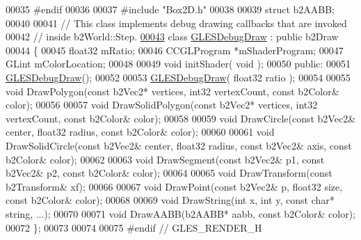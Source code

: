 \begin{DoxyCode}
00035 \textcolor{preprocessor}{#endif}
00036 \textcolor{preprocessor}{}
00037 \textcolor{preprocessor}{#include "Box2D.h"}
00038 
00039 \textcolor{keyword}{struct }b2AABB;
00040 
00041 \textcolor{comment}{// This class implements debug drawing callbacks that are invoked}
00042 \textcolor{comment}{// inside b2World::Step.}
\hypertarget{_g_l_e_s-_render_8h_source_l00043}{}\hyperlink{class_g_l_e_s_debug_draw}{00043} \textcolor{keyword}{class }\hyperlink{class_g_l_e_s_debug_draw}{GLESDebugDraw} : \textcolor{keyword}{public} b2Draw
00044 \{
00045     float32 mRatio;
00046     CCGLProgram *mShaderProgram;
00047     GLint       mColorLocation;
00048 
00049     \textcolor{keywordtype}{void} initShader( \textcolor{keywordtype}{void} );
00050 \textcolor{keyword}{public}:
00051     \hyperlink{class_g_l_e_s_debug_draw}{GLESDebugDraw}();
00052 
00053     \hyperlink{class_g_l_e_s_debug_draw}{GLESDebugDraw}( float32 ratio );
00054 
00055     \textcolor{keywordtype}{void} DrawPolygon(\textcolor{keyword}{const} b2Vec2* vertices, int32 vertexCount, \textcolor{keyword}{const} b2Color& color);
00056 
00057     \textcolor{keywordtype}{void} DrawSolidPolygon(\textcolor{keyword}{const} b2Vec2* vertices, int32 vertexCount, \textcolor{keyword}{const} b2Color& color);
00058 
00059     \textcolor{keywordtype}{void} DrawCircle(\textcolor{keyword}{const} b2Vec2& center, float32 radius, \textcolor{keyword}{const} b2Color& color);
00060 
00061     \textcolor{keywordtype}{void} DrawSolidCircle(\textcolor{keyword}{const} b2Vec2& center, float32 radius, \textcolor{keyword}{const} b2Vec2& axis, \textcolor{keyword}{const} b2Color& color);
00062 
00063     \textcolor{keywordtype}{void} DrawSegment(\textcolor{keyword}{const} b2Vec2& p1, \textcolor{keyword}{const} b2Vec2& p2, \textcolor{keyword}{const} b2Color& color);
00064 
00065     \textcolor{keywordtype}{void} DrawTransform(\textcolor{keyword}{const} b2Transform& xf);
00066 
00067     \textcolor{keywordtype}{void} DrawPoint(\textcolor{keyword}{const} b2Vec2& p, float32 size, \textcolor{keyword}{const} b2Color& color);
00068 
00069     \textcolor{keywordtype}{void} DrawString(\textcolor{keywordtype}{int} x, \textcolor{keywordtype}{int} y, \textcolor{keyword}{const} \textcolor{keywordtype}{char}* \textcolor{keywordtype}{string}, ...);
00070 
00071     \textcolor{keywordtype}{void} DrawAABB(b2AABB* aabb, \textcolor{keyword}{const} b2Color& color);
00072 \};
00073 
00074 
00075 \textcolor{preprocessor}{#endif // GLES\_RENDER\_H}
\end{DoxyCode}
